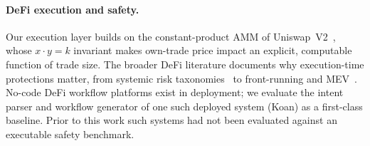 \paragraph{DeFi execution and safety.} Our execution layer builds on the
constant-product AMM of Uniswap~V2~\cite{uniswapv2}, whose
$x \cdot y = k$ invariant makes own-trade price impact an explicit,
computable function of trade size. The broader DeFi literature documents why
execution-time protections matter, from systemic risk
taxonomies~\cite{sokdefi2022} to front-running and MEV~\cite{flashboys2020}.
No-code DeFi workflow platforms exist in deployment; we evaluate the
intent parser and workflow generator of one such deployed system (Koan) as
a first-class baseline. Prior to this work such systems had not been
evaluated against an executable safety benchmark.
